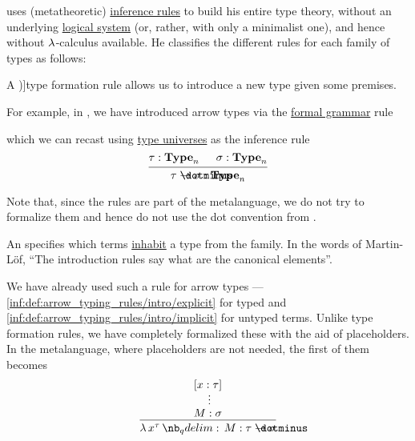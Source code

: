 \begin{remark}\label{rem:type_theory_rule_classification}
   uses (metatheoretic) \hyperref[def:inference_rule]{inference rules} to build his entire type theory, without an underlying \hyperref[con:logical_system]{logical system} (or, rather, with only a minimalist one), and hence without \( \mathrm{\lambda} \)-calculus available. He classifies the different rules for each family of types as follows:
  \begin{thmenum}
     A \term[en=formation (rule) (\cite[\S 8.1.9]{Mimram2020ProgramEqualsProof})]{type formation} rule allows us to introduce a new type given some premises.

    For example, in , we have introduced arrow types via the \hyperref[def:formal_grammar/schema]{formal grammar} rule
    \begin{bnf*}
       {\bnftsq{(} \bnfsp {} \bnfsp \bnftsq{\( \synimplies \)} \bnfsp {} \bnfsp \bnftsq{)}}
    \end{bnf*}
    which we can recast using \hyperref[rem:type_universes]{type universes} as the inference rule
    \begin{equation*}
      \begin{prooftree}
        \hypo{ \tau: \op*{Type}_n }
        \hypo{ \sigma: \op*{Type}_n }
        \infer2{ \tau \synimplies \sigma: \op*{Type}_n }
      \end{prooftree}
    \end{equation*}

    Note that, since the rules are part of the metalanguage, we do not try to formalize them and hence do not use the dot convention from .

     An  specifies which terms \hyperref[def:type_habitation]{inhabit} a type from the family. In the words of Martin-L\"of, \enquote{The introduction rules say what are the canonical elements}.

    We have already used such a rule for arrow types --- \ref{inf:def:arrow_typing_rules/intro/explicit} for typed and \ref{inf:def:arrow_typing_rules/intro/implicit} for untyped terms. Unlike type formation rules, we have completely formalized these with the aid of placeholders. In the metalanguage, where placeholders are not needed, the first of them becomes
    \begin{equation*}
      \begin{prooftree}
        \hypo{ [x: \tau] }
        \ellipsis {} { M: \sigma }
        \infer1{ \qabs {x^{\tau}} M: \tau \synimplies \sigma }
      \end{prooftree}
    \end{equation*}


\end{thmenum}
\end{remark}
